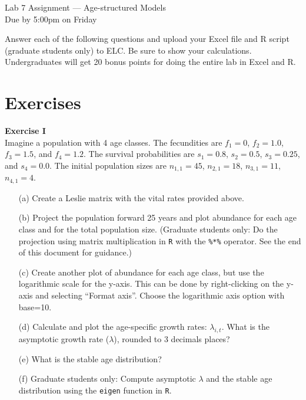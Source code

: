 \documentclass[12pt]{article}\usepackage[]{graphicx}\usepackage[]{xcolor}
\begin{document}
{
  \Large
  \centering
  Lab 7 Assignment --- Age-structured Models \\
  Due by 5:00pm on Friday \par
}

\vspace{12pt}

Answer each of the following questions and upload your Excel file and
R script (graduate students only) to ELC. Be sure to show your
calculations. Undergraduates will get 20 bonus points for doing the entire 
lab in Excel and R. \\ 

\section*{Exercises}


{\bf Exercise I \\}
Imagine a population with 4 age classes. The fecundities are $f_1=0$,
$f_2=1.0$, $f_3=1.5$, and $f_4=1.2$. The survival probabilities are
$s_1=0.8$, $s_2=0.5$, $s_3=0.25$, and $s_4=0.0$. The initial
population sizes are $n_{1,1}=45$, $n_{2,1}=18$, $n_{3,1}=11$, $n_{4,1}=4$.
\begin{itemize}
  \item[(a)] Create a Leslie matrix with the vital rates provided above.
  \item[(b)] Project the population forward 25 years and plot abundance for
    each age class and for the total population size. (Graduate students
    only: Do the projection using matrix multiplication in {\tt R} with
    the \texttt{\%*\%} operator. See the end of this document for
    guidance.)
  \item[(c)] Create another plot of abundance for each age class, but use the
    logarithmic scale for the y-axis. This can be done by right-clicking
    on the y-axis and selecting ``Format axis''. Choose the logarithmic
    axis option with base=10.
  \item[(d)] Calculate and plot the age-specific
    growth rates: $\lambda_{i,t}$. What is the asymptotic growth rate
    ($\lambda$), rounded to 3 decimals places?
  \item[(e)] What is the stable age distribution?
  \item[(f)] Graduate students only: Compute asymptotic $\lambda$ and
    the stable age distribution using the \texttt{eigen} function in {\tt R}.
\end{itemize}
\end{document}

